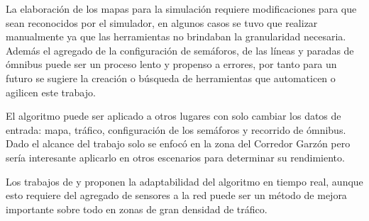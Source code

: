 La elaboración de los mapas para la simulación requiere modificaciones para que sean reconocidos por el simulador, en algunos casos se tuvo que realizar manualmente ya que las herramientas no brindaban la granularidad necesaria.
Además el agregado de la configuración de semáforos, de las líneas y paradas de ómnibus puede ser un proceso lento y propenso a errores, por tanto para un futuro se sugiere la creación o búsqueda de herramientas que automaticen o agilicen este trabajo.

El algoritmo puede ser aplicado a otros lugares con solo cambiar los datos de entrada: mapa, tráfico, configuración de los semáforos y recorrido de ómnibus. Dado el alcance del trabajo solo se enfocó en la zona del Corredor Garzón pero sería interesante aplicarlo en otros escenarios para determinar su rendimiento.

Los trabajos de  \citet{Montana1996} y \citet{Vogel2000}  proponen la adaptabilidad del algoritmo en tiempo real, aunque esto requiere del agregado de sensores a la red puede ser un método de mejora importante sobre todo en zonas de gran densidad de tráfico.
